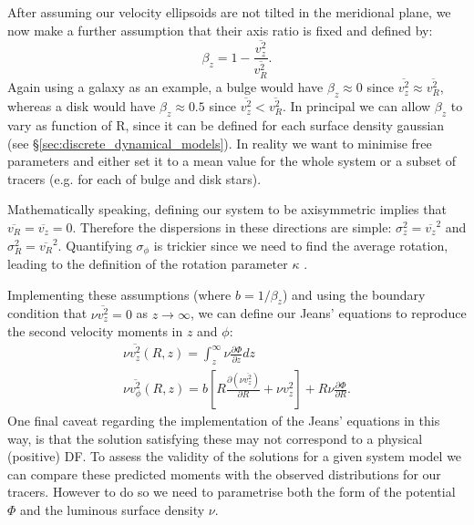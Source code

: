 After assuming our velocity ellipsoids are not tilted in the meridional plane, we now make a further assumption that their axis ratio is fixed and defined by:
\begin{equation} \label{beta_z}
\beta_z = 1 - \frac{\overline{v_{z}^2}}{\overline{v_{R}^2}}.
\end{equation}
Again using a galaxy as an example, a bulge would have $\beta_z \approx 0$ since $\overline{v_z^2} \approx \overline{v_R^2}$, whereas a disk would have $\beta_z \approx 0.5$ since $\overline{v_z^2} < \overline{v_R^2}$. In principal we can allow $\beta_z$ to vary as function of R, since it can be defined for each surface density gaussian (see \S\ref{sec:discrete_dynamical_models}). In reality we want to minimise free parameters and either set it to a mean value for the whole system or a subset of tracers (e.g. for each of bulge and disk stars). 

Mathematically speaking, defining our system to be axisymmetric implies that $\overline{v_{R}} = \overline{v_{z}} = 0$. Therefore the dispersions in these directions are simple: $\sigma_{z}^2 = \overline{v_z}^2$ and $\sigma_{R}^2 = \overline{v_R}^2$. Quantifying $\sigma_{\phi}$ is trickier since we need to find the average rotation, leading to the definition of the rotation parameter $\kappa$ \citep[e.g. Equation 22 in][]{watkins2013}. 

Implementing these assumptions (where $b = 1/\beta_z$) and using the boundary condition that $\nu \overline{v_z^2} = 0$ as $z \to \infty$, we can define our Jeans' equations to reproduce the second velocity moments in $z$ and $\phi$:
\begin{eqnarray} \label{jeans1}
\nu \overline{v_z^2}(R,z) = \int^{\infty}_{z} \nu \frac{\partial \Phi}{\partial z} dz \\
\nu \overline{v_{\phi}^2}(R,z) = b \left[ R \frac{\partial (\nu \overline{v_z^2})}{\partial R} + \nu v_{z}^2\right] + R\nu \frac{\partial \Phi}{\partial R} . \label{jeans2}
\end{eqnarray}
One final caveat regarding the implementation of the Jeans' equations in this way, is that the solution satisfying these may not correspond to a physical (positive) DF. To assess the validity of the solutions for a given system model we can compare these predicted moments with the observed distributions for our tracers. However to do so we need to parametrise both the form of the potential $\Phi$ and the luminous surface density $\nu$.

